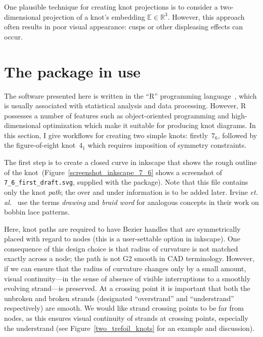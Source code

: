\documentclass{birkjour}
\theoremstyle{definition}
\theoremstyle{remark}
\numberwithin{equation}{section}
\begin{document}
One plausible technique for creating knot projections is to consider a
two-dimensional projection of a knot's embedding
$\mathbb{E}\in\mathbb{R}^3$.  However, this approach often results in
poor visual appearance: cusps or other displeasing effects can occur.

\section{The package in use}

The software presented here is written in the ``R'' programming
language~\cite{rcore2021}, which is usually associated with
statistical analysis and data processing.  However, R possesses a
number of features such as object-oriented programming and
high-dimensional optimization which make it suitable for producing
knot diagrams.  In this section, I give workflows for creating two
simple knots: firstly~$7_6$, followed by the figure-of-eight
knot~$4_1$ which requires imposition of symmetry constraints.

The first step is to create a closed curve in inkscape that shows the
rough outline of the knot~(Figure~\ref{screenshot_inkscape_7_6} shows
a screenshot of {\tt 7\_6\_first\_draft.svg}, supplied with the
package).  Note that this file contains only the knot {\em path}; the
over and under information is to be added later.  Irvine {\em
  et. al.}~\cite{irvine2020} use the terms {\em drawing} and {\em
  braid word} for analogous concepts in their work on bobbin lace
patterns.

Here, knot paths are required to have Bezier handles that are
symmetrically placed with regard to nodes (this is a user-settable
option in inkscape).  One consequence of this design choice is that
radius of curvature is not matched exactly across a node; the path is
not G2 smooth in CAD terminology.  However, if we can ensure that the
radius of curvature changes only by a small amount, visual
continuity---in the sense of absence of visible interruptions to a
smoothly evolving strand---is preserved.  At a crossing point it is
important that both the unbroken and broken strands (designated
``overstrand'' and ``understrand'' respectively) are smooth.  We would
like strand crossing points to be far from nodes, as this ensures
visual continuity of strands at crossing points, especially the
understrand (see Figure~\ref{two_trefoil_knots} for an example and
discussion).
\end{document}

